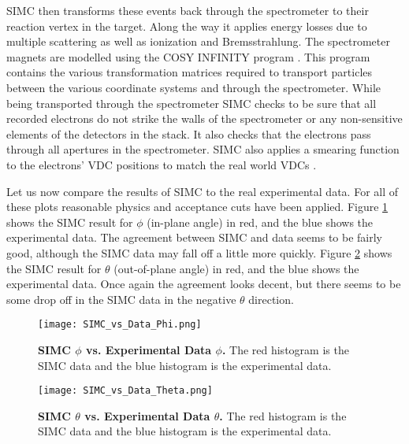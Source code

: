 SIMC then transforms these events back through the spectrometer to their reaction vertex in the target. Along the way it applies energy losses due to multiple scattering as well as ionization and Bremsstrahlung. The spectrometer magnets are modelled using the COSY INFINITY program \cite{cosy}. This program contains the various transformation matrices required to transport particles between the various coordinate systems and through the spectrometer. While being transported through the spectrometer SIMC checks to be sure that all recorded electrons do not strike the walls of the spectrometer or any non-sensitive elements of the detectors in the stack. It also checks that the electrons pass through all apertures in the spectrometer. SIMC also applies a smearing function to the electrons' VDC positions to match the real world VDCs \cite{Thesis:Wang}. 

Let us now compare the results of SIMC to the real experimental data. For all of these plots reasonable physics and acceptance cuts have been applied. Figure \ref{fig:simc_phi} shows the SIMC result for $\phi$ (in-plane angle) in red, and the blue shows the experimental data. The agreement between SIMC and data seems to be fairly good, although the SIMC data may fall off a little more quickly. Figure \ref{fig:simc_theta} shows the SIMC result for $\theta$ (out-of-plane angle) in red, and the blue shows the experimental data. Once again the agreement looks decent, but there seems to be some drop off in the SIMC data in the negative $\theta$ direction.  

\begin{figure}[!ht]
\begin{center}
\texttt{[image: SIMC\_vs\_Data\_Phi.png]}
\end{center}
\caption[SIMC $\phi$ vs. Experimental Data $\phi$]{
{\bf{SIMC $\phi$ vs. Experimental Data $\phi$.}} The red histogram is the SIMC data and the blue histogram is the experimental data.}
\label{fig:simc_phi}
\end{figure}

\begin{figure}[!ht]
\begin{center}
\texttt{[image: SIMC\_vs\_Data\_Theta.png]}
\end{center}
\caption[SIMC $\theta$ vs. Experimental Data $\theta$]{
{\bf{SIMC $\theta$ vs. Experimental Data $\theta$.}} The red histogram is the SIMC data and the blue histogram is the experimental data.}
\label{fig:simc_theta}
\end{figure}

